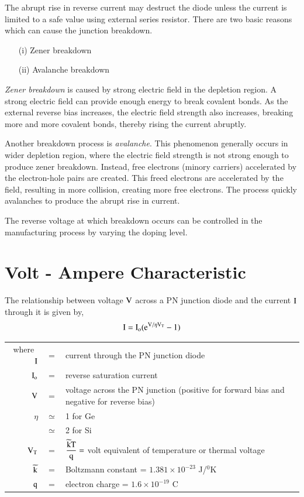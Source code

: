 The abrupt rise in reverse current may destruct the diode unless the current is limited to a safe value using external series resistor. There are two basic reasons which can cause the junction breakdown.
\begin{itemize}
\item[(i)] Zener breakdown

\item[(ii)] Avalanche breakdown
\end{itemize}

{\em Zener breakdown} is caused by strong electric field in the depletion region. A strong electric field can provide enough energy to break covalent bonds. As the external reverse bias increases, the electric field strength also increases, breaking more and more covalent bonds, thereby rising the current abruptly.

Another breakdown process is {\em avalanche}. This phenomenon generally occurs in wider depletion region, where the electric field strength is not strong enough to produce zener breakdown. Instead, free electrons (minory carriers) accelerated by the electron-hole pairs are created. This freed electrons are accelerated by the field, resulting in more collision, creating more free electrons. The process quickly avalanches to produce the abrupt rise in current.

The reverse voltage at which breakdown occurs can be controlled in the manufacturing process by varying the doping level.

\section{Volt - Ampere Characteristic}\label{sec1.7}

The relationship between voltage $\textrm{V}$ across a PN junction diode and the current $\textrm{I}$ through it is given by,
\begin{equation}
\textrm{I}=\textrm{I}_{\textrm{o}}(\textrm{e}^{\textrm{V}/\eta \textrm{V}_{\textrm{T}}}-1)\label{eq1.6}
\end{equation}

\noindent
\begin{tabular}{@{}r@{\;\,}c@{\;\,}p{10.5cm}}
where~ $\textrm{I}$ & = & current through the PN junction diode\\[3pt]
      $\textrm{I}_{\textrm{o}}$ & = & reverse saturation current\\[3pt]
      $\textrm{V}$ & = & voltage across the PN junction (positive for forward bias and negative for reverse bias)\\[3pt]
      $\eta$ & $\simeq$ & 1 for Ge\\[3pt]
             & $\simeq$ & 2 for Si\\[3pt]
      $\textrm{V}_{\textrm{T}}$ & = & $\dfrac{\widetilde{\textrm{k}}\textrm{T}}{\textrm{q}}=$ volt equivalent of temperature or thermal voltage\\[3pt]
   $\widetilde{\textrm{k}}$ & = & Boltzmann constant = $1.381\times 10^{-23}$ J/$^{0}$K\\[3pt]
   $\textrm{q}$ & = & electron charge = $1.6\times 10^{-19}$ C
\end{tabular}

